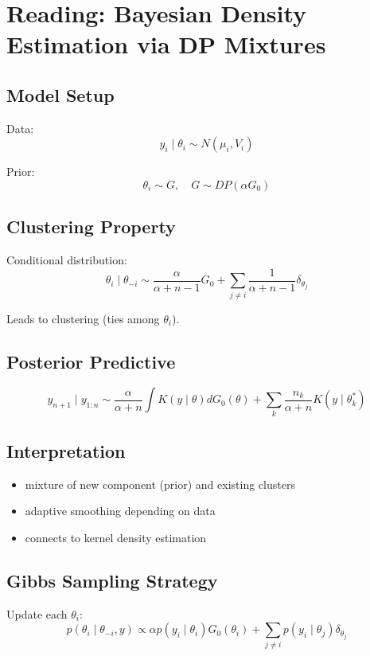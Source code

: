 \documentclass[12pt,oneside]{book}
\numberwithin{equation}{section}
\theoremstyle{definition}
\theoremstyle{plain}
\theoremstyle{remark}
\begin{document}
\section{Reading: Bayesian Density Estimation via DP Mixtures}

\subsection*{Model Setup}

Data:
\[
y_i \mid \theta_i \sim N(\mu_i, V_i)
\]

Prior:
\[
\theta_i \sim G, \quad G \sim DP(\alpha G_0)
\]

\subsection*{Clustering Property}

Conditional distribution:
\[
\theta_i \mid \theta_{-i}
\sim
\frac{\alpha}{\alpha+n-1} G_0 + \sum_{j\neq i} \frac{1}{\alpha+n-1} \delta_{\theta_j}
\]

Leads to clustering (ties among $\theta_i$).

\subsection*{Posterior Predictive}

\[
y_{n+1} \mid y_{1:n}
\sim
\frac{\alpha}{\alpha+n} \int K(y \mid \theta) dG_0(\theta)
+
\sum_{k} \frac{n_k}{\alpha+n} K(y \mid \theta_k^*)
\]

\subsection*{Interpretation}

\begin{itemize}
\item mixture of new component (prior) and existing clusters
\item adaptive smoothing depending on data
\item connects to kernel density estimation
\end{itemize}

\subsection*{Gibbs Sampling Strategy}

Update each $\theta_i$:
\[
p(\theta_i \mid \theta_{-i}, y)
\propto
\alpha p(y_i \mid \theta_i) G_0(\theta_i)
+
\sum_{j\neq i} p(y_i \mid \theta_j) \delta_{\theta_j}
\]
\end{document}
